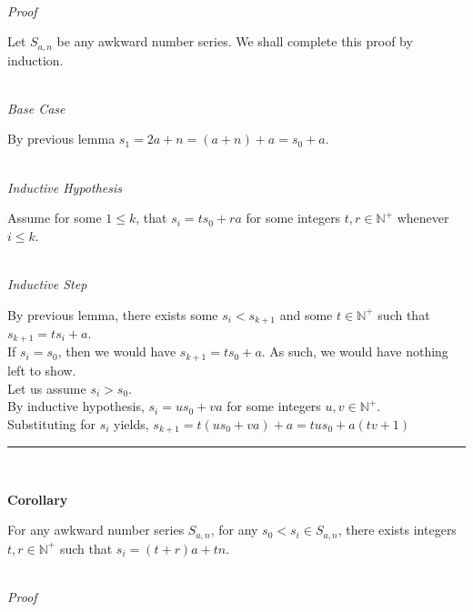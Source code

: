 \documentclass[a4paper,12pt]{article}
\begin{document}
\noindent \\
\textit{Proof}

\noindent Let $S_{a, n}$ be any awkward number series. We shall complete this proof by induction.


\noindent \\
\textit{Base Case}

\noindent By previous lemma $s_1 = 2a + n = (a + n) + a = s_0 + a$.


\noindent \\
\textit{Inductive Hypothesis}

\noindent Assume for some $1 \leq k$, that $s_i = ts_0 + ra$ for some integers $t, r \in \mathbb{N}^+$ whenever $i \leq k$.


\noindent  \\
\textit{Inductive Step}

\noindent By previous lemma, there exists some $s_i < s_{k+1}$ and some $t \in \mathbb{N}^+$ such that $s_{k+1} = ts_i + a$.\\


\noindent If $s_i = s_0$, then we would have $s_{k+1} = ts_0 + a$. As such, we would have nothing left to show.\\

\noindent Let us assume $s_i > s_0$.\\

\noindent By inductive hypothesis, $s_i = us_0 + va$ for some integers $u, v \in \mathbb{N}^+$.\\

\noindent Substituting for $s_i$ yields, $s_{k + 1} = t(us_0 + va) + a = tus_0 + a(tv + 1)$


\begin{center}
\noindent\rule{8cm}{0.4pt}
\end{center}
\noindent \\








\label{corollary:relation_to_initial_p2}
\hypertarget{corollary:relation_to_initial_p2}{}
\begin{tcolorbox}
\textbf{Corollary}

For any awkward number series $S_{a,n}$, for any $s_0 < s_i \in S_{a,n}$, there exists integers $t, r \in \mathbb{N}^+$ such that $s_i = (t + r)a + tn$.

\end{tcolorbox}


\noindent \\
\textit{Proof}
\end{document}
